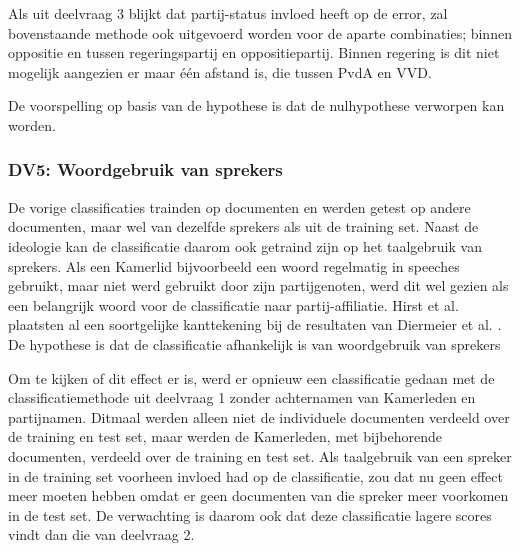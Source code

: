 Als uit deelvraag 3 blijkt dat partij-status invloed heeft op de error, zal bovenstaande methode ook uitgevoerd worden voor de aparte combinaties; binnen oppositie en tussen regeringspartij en oppositiepartij. Binnen regering is dit niet mogelijk aangezien er maar één afstand is, die tussen PvdA en VVD.\par
De voorspelling op basis van de hypothese is dat de nulhypothese verworpen kan worden.\par

\subsubsection{DV5: Woordgebruik van sprekers}
De vorige classificaties trainden op documenten en werden getest op andere documenten, maar wel van dezelfde sprekers als uit de training set. Naast de ideologie kan de classificatie daarom ook getraind zijn op het taalgebruik van sprekers. Als een Kamerlid bijvoorbeeld een woord regelmatig in speeches gebruikt, maar niet werd gebruikt door zijn partijgenoten, werd dit wel gezien als een belangrijk woord voor de classificatie naar partij-affiliatie. Hirst et al. \cite{Hirst_textto} plaatsten al een soortgelijke kanttekening bij de resultaten van Diermeier et al. \cite{diermeier_godbout_yu_kaufmann_2012}. De hypothese is dat de classificatie afhankelijk is van woordgebruik van sprekers\par
Om te kijken of dit effect er is, werd er opnieuw een classificatie gedaan met de classificatiemethode uit deelvraag 1 zonder achternamen van Kamerleden en partijnamen. Ditmaal werden alleen niet de individuele documenten verdeeld over de training en test set, maar werden de Kamerleden, met bijbehorende documenten, verdeeld over de training en test set. Als taalgebruik van een spreker in de training set voorheen invloed had op de classificatie, zou dat nu geen effect meer moeten hebben omdat er geen documenten van die spreker meer voorkomen in de test set. De verwachting is daarom ook dat deze classificatie lagere scores vindt dan die van deelvraag 2.\par


